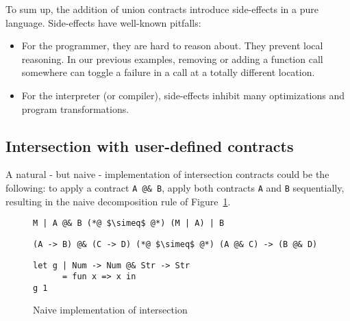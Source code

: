 \documentclass[sigplan,10pt,review,anonymous]{acmart}
\newcommand{\unsure}[2][1=]{}
\newcommand{\nickel}[1]{\lstinline[language=nickel]{#1}}
\begin{document}
\unsure{These arguments should go in the purity section}
To sum up, the addition of union contracts introduce side-effects in a pure
language. Side-effects have well-known pitfalls:
\begin{itemize}
    \item For the programmer, they are hard to reason about. They prevent local
        reasoning. In our previous examples, removing or adding a function call
        somewhere can toggle a failure in a call at a totally different
        location.
    \item For the interpreter (or compiler), side-effects inhibit many optimizations and
        program transformations.
\end{itemize}


%


\subsection{Intersection with user-defined contracts}
\label{sec:flat-and-inter}

A natural - but naive - implementation of intersection contracts could be the
following: to apply a contract \nickel{A @& B}, apply both contracts \nickel{A}
and \nickel{B} sequentially, resulting in the naive decomposition rule of
Figure~\ref{fig:naive-impl}.

\begin{figure}[h]
\begin{lstlisting}[language=nickel,frame=none,numbers=none,title={Naive
decomposition}]
M | A @& B (*@ $\simeq$ @*) (M | A) | B
\end{lstlisting}
\begin{lstlisting}[language=nickel,frame=none,numbers=none,title={Exchange law}]
(A -> B) @& (C -> D) (*@ $\simeq$ @*) (A @& C) -> (B @& D)
\end{lstlisting}
\begin{lstlisting}[language=nickel,title={Overloaded identity}]
let g | Num -> Num @& Str -> Str
      = fun x => x in
g 1
\end{lstlisting}
\caption{Naive implementation of intersection}
\label{fig:naive-impl}
\end{figure}
\end{document}
